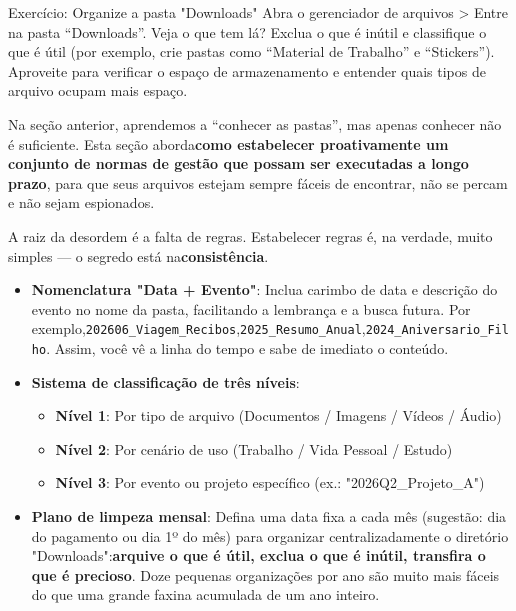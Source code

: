 \begin{tcbpractice}{Exercício: Organize a pasta "Downloads"}
Abra o gerenciador de arquivos > Entre na pasta “Downloads”. Veja o que tem lá? Exclua o que é inútil e classifique o que é útil (por exemplo, crie pastas como “Material de Trabalho” e “Stickers”). Aproveite para verificar o espaço de armazenamento e entender quais tipos de arquivo ocupam mais espaço.

\end{tcbpractice}


Na seção anterior, aprendemos a “conhecer as pastas”, mas apenas conhecer não é suficiente. Esta seção aborda\textbf{como estabelecer proativamente um conjunto de normas de gestão que possam ser executadas a longo prazo}, para que seus arquivos estejam sempre fáceis de encontrar, não se percam e não sejam espionados.


A raiz da desordem é a falta de regras. Estabelecer regras é, na verdade, muito simples — o segredo está na\textbf{consistência}.

\begin{itemize}
  \item \textbf{Nomenclatura "Data + Evento"}: Inclua carimbo de data e descrição do evento no nome da pasta, facilitando a lembrança e a busca futura. Por exemplo,\texttt{202606\_Viagem\_Recibos},\texttt{2025\_Resumo\_Anual},\texttt{2024\_Aniversario\_Filho}. Assim, você vê a linha do tempo e sabe de imediato o conteúdo.
  \item \textbf{Sistema de classificação de três níveis}:
  \begin{itemize}
    \item \textbf{Nível 1}: Por tipo de arquivo (Documentos / Imagens / Vídeos / Áudio)
    \item \textbf{Nível 2}: Por cenário de uso (Trabalho / Vida Pessoal / Estudo)
    \item \textbf{Nível 3}: Por evento ou projeto específico (ex.: "2026Q2\_Projeto\_A")
  \end{itemize}
  \item \textbf{Plano de limpeza mensal}: Defina uma data fixa a cada mês (sugestão: dia do pagamento ou dia 1º do mês) para organizar centralizadamente o diretório "Downloads":\textbf{arquive o que é útil, exclua o que é inútil, transfira o que é precioso}. Doze pequenas organizações por ano são muito mais fáceis do que uma grande faxina acumulada de um ano inteiro.
\end{itemize}

